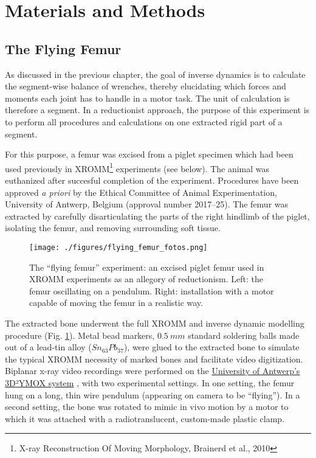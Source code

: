 \FloatBarrier\clearpage
\section{Materials and Methods}
\label{sec:orgc33929d}
\subsection{The Flying Femur}
\label{sec:orge89c849}

As discussed in the previous chapter, the goal of inverse dynamics is to calculate the segment-wise balance of wrenches, thereby elucidating which forces and moments each joint has to handle in a motor task.
The unit of calculation is therefore a segment.
In a reductionist approach, the purpose of this experiment is to perform all procedures and calculations on one extracted rigid part of a segment.

For this purpose, a femur was excised from a piglet specimen which had been used previously in XROMM\footnote{X-ray Reconstruction Of Moving Morphology, Brainerd et al., 2010} experiments (see below). \nocite{Brainerd2010}
The animal was euthanized after succesful completion of the experiment.
Procedures have been approved \emph{a priori} by the Ethical Committee of Animal Experimentation, University of Antwerp, Belgium (approval number 2017–25).
The femur was extracted by carefully disarticulating the parts of the right hindlimb of the piglet, isolating the femur, and removing surrounding soft tissue.

\begin{figure}[p]
\centering
\texttt{[image: ./figures/flying\_femur\_fotos.png]}
\caption{\label{fig:flying_femur_fotos}The ``flying femur'' experiment: an excised piglet femur used in XROMM experiments as an allegory of reductionism. Left: the femur oscillating on a pendulum. Right: installation with a motor capable of moving the femur in a realistic way.}
\end{figure}


The extracted bone underwent the full XROMM and inverse dynamic modelling procedure (Fig. \ref{fig:flying_femur_fotos}).
Metal bead markers, \(0.5\ mm\) standard soldering balls made out of a lead-tin alloy (\(Sn_{63}Pb_{37}\)), were glued to the extracted bone to simulate the typical XROMM necessity of marked bones and facilitate video digitization.
Biplanar x-ray video recordings were performed on the \href{https://www.uantwerpen.be/3d2ymox}{University of Antwerp's 3D²YMOX system} \citep{Nguyen2021,Sanctorum2020}, with two experimental settings.
In one setting, the femur hung on a long, thin wire pendulum (appearing on camera to be ``flying'').
In a second setting, the bone was rotated to mimic in vivo motion by a motor to which it was attached with a radiotranslucent, custom-made plastic clamp.


